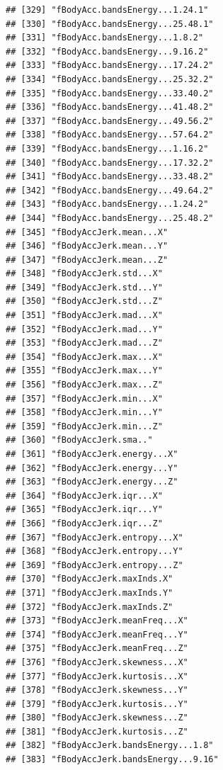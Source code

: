 \documentclass[
]{article}
\begin{document}
\begin{verbatim}
## [329] "fBodyAcc.bandsEnergy...1.24.1"       
## [330] "fBodyAcc.bandsEnergy...25.48.1"      
## [331] "fBodyAcc.bandsEnergy...1.8.2"        
## [332] "fBodyAcc.bandsEnergy...9.16.2"       
## [333] "fBodyAcc.bandsEnergy...17.24.2"      
## [334] "fBodyAcc.bandsEnergy...25.32.2"      
## [335] "fBodyAcc.bandsEnergy...33.40.2"      
## [336] "fBodyAcc.bandsEnergy...41.48.2"      
## [337] "fBodyAcc.bandsEnergy...49.56.2"      
## [338] "fBodyAcc.bandsEnergy...57.64.2"      
## [339] "fBodyAcc.bandsEnergy...1.16.2"       
## [340] "fBodyAcc.bandsEnergy...17.32.2"      
## [341] "fBodyAcc.bandsEnergy...33.48.2"      
## [342] "fBodyAcc.bandsEnergy...49.64.2"      
## [343] "fBodyAcc.bandsEnergy...1.24.2"       
## [344] "fBodyAcc.bandsEnergy...25.48.2"      
## [345] "fBodyAccJerk.mean...X"               
## [346] "fBodyAccJerk.mean...Y"               
## [347] "fBodyAccJerk.mean...Z"               
## [348] "fBodyAccJerk.std...X"                
## [349] "fBodyAccJerk.std...Y"                
## [350] "fBodyAccJerk.std...Z"                
## [351] "fBodyAccJerk.mad...X"                
## [352] "fBodyAccJerk.mad...Y"                
## [353] "fBodyAccJerk.mad...Z"                
## [354] "fBodyAccJerk.max...X"                
## [355] "fBodyAccJerk.max...Y"                
## [356] "fBodyAccJerk.max...Z"                
## [357] "fBodyAccJerk.min...X"                
## [358] "fBodyAccJerk.min...Y"                
## [359] "fBodyAccJerk.min...Z"                
## [360] "fBodyAccJerk.sma.."                  
## [361] "fBodyAccJerk.energy...X"             
## [362] "fBodyAccJerk.energy...Y"             
## [363] "fBodyAccJerk.energy...Z"             
## [364] "fBodyAccJerk.iqr...X"                
## [365] "fBodyAccJerk.iqr...Y"                
## [366] "fBodyAccJerk.iqr...Z"                
## [367] "fBodyAccJerk.entropy...X"            
## [368] "fBodyAccJerk.entropy...Y"            
## [369] "fBodyAccJerk.entropy...Z"            
## [370] "fBodyAccJerk.maxInds.X"              
## [371] "fBodyAccJerk.maxInds.Y"              
## [372] "fBodyAccJerk.maxInds.Z"              
## [373] "fBodyAccJerk.meanFreq...X"           
## [374] "fBodyAccJerk.meanFreq...Y"           
## [375] "fBodyAccJerk.meanFreq...Z"           
## [376] "fBodyAccJerk.skewness...X"           
## [377] "fBodyAccJerk.kurtosis...X"           
## [378] "fBodyAccJerk.skewness...Y"           
## [379] "fBodyAccJerk.kurtosis...Y"           
## [380] "fBodyAccJerk.skewness...Z"           
## [381] "fBodyAccJerk.kurtosis...Z"           
## [382] "fBodyAccJerk.bandsEnergy...1.8"      
## [383] "fBodyAccJerk.bandsEnergy...9.16"     

\end{verbatim}
\end{document}
